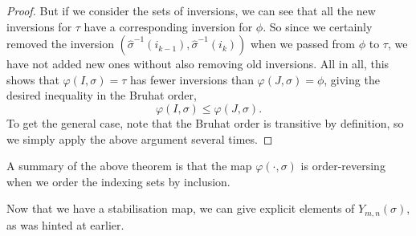 \begin{proof}
  But if we consider the sets of inversions, we can see that all the
  new inversions for $\tau$ have a corresponding inversion for
  $\phi$. So since we certainly removed the inversion
  $(\widehat{\sigma}^{-1}(i_{k-1}),\widehat{\sigma}^{-1}(i_{k}))$ when
  we passed from $\phi$ to $\tau$, we have not added new ones without
  also removing old inversions. All in all, this shows that
  $\varphi(I,\sigma) = \tau$ has fewer inversions than
  $\varphi(J,\sigma) = \phi$, giving the desired inequality in the
  Bruhat order,
  \[ \varphi(I,\sigma) \leq \varphi(J,\sigma). \]
  To get the general case, note that the Bruhat order is transitive
  by definition, so we simply apply the above argument several times.
\end{proof}

A summary of the above theorem is that the map $\varphi(\cdot,\sigma)$
is order-reversing when we order the indexing sets by inclusion.

Now that we have a stabilisation map, we can give explicit elements of
$Y_{m,n}(\sigma)$, as was hinted at earlier.

